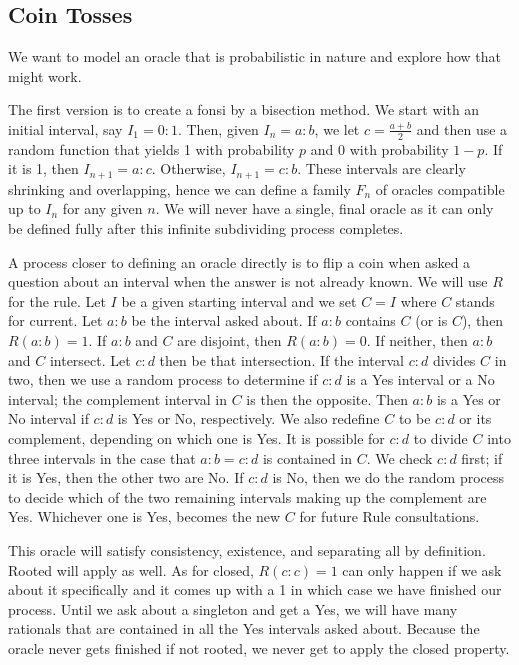 \documentclass[12pt]{article}
\begin{document}
\subsection{Coin Tosses}

We want to model an oracle that is probabilistic in nature and explore how that might work. 

The first version is to create a fonsi by a bisection method. We start with an initial interval, say $I_1 = 0:1$. Then, given $I_n = a:b$, we let $c = \tfrac{a+b}{2}$ and then use a random function that yields 1 with probability $p$ and 0 with probability $1-p$. If it is 1, then $I_{n+1} = a:c$. Otherwise, $I_{n+1} = c:b$. These intervals are clearly shrinking and overlapping, hence we can define a family $F_n$ of oracles compatible up to $I_n$ for any given $n$. We will never have a single, final oracle as it can only be defined fully after this infinite subdividing process completes. 

A process closer to defining an oracle directly is to flip a coin when asked a question about an interval when the answer is not already known. We will use $R$ for the rule. Let $I$ be a given starting interval and we set $C=I$ where $C$ stands for current. Let $a:b$ be the interval asked about. If $a:b$ contains $C$ (or is $C$), then $R(a:b) = 1$. If $a:b$ and $C$ are disjoint, then $R(a:b) = 0$. If neither, then $a:b$ and $C$ intersect. Let $c:d$ then be that intersection. If the interval $c:d$ divides $C$ in two, then we use a random process to determine if $c:d$ is a Yes interval or a No interval; the complement interval in $C$ is then the opposite. Then $a:b$ is a Yes or No interval if $c:d$ is Yes or No, respectively. We also redefine $C$ to be $c:d$ or its complement, depending on which one is Yes. It is possible for $c:d$ to divide $C$ into three intervals in the case that $a:b=c:d$ is contained in $C$. We check $c:d$ first; if it is Yes, then the other two are No. If $c:d$ is No, then we do the random process to decide which of the two remaining intervals making up the complement are Yes. Whichever one is Yes, becomes the new $C$ for future Rule consultations.  

This oracle will satisfy consistency, existence, and separating all by definition. Rooted will apply as well. As for closed, $R(c:c)=1$ can only happen if we ask about it specifically and it comes up with a 1 in which case we have finished our process. Until we ask about a singleton and get a Yes, we will have many rationals that are contained in all the Yes intervals asked about. Because the oracle never gets finished if not rooted, we never get to apply the closed property. 
\end{document}

